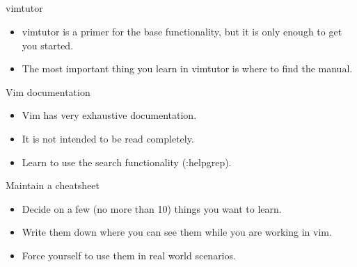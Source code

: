 \documentclass{beamer}
\begin{document}
    \subsection{}
    \begin{frame}{vimtutor}
        \begin{itemize}
            \item vimtutor is a primer for the base functionality, but it is only enough to get you started.
            \item The most important thing you learn in vimtutor is where to find the manual.
        \end{itemize}
    \end{frame}
    \begin{frame}{Vim documentation}
        \begin{itemize}
            \item Vim has very exhaustive documentation.
            \item It is not intended to be read completely.  %
            \item Learn to use the search functionality (:helpgrep).
        \end{itemize}
    \end{frame}
    \begin{frame}{Maintain a cheatsheet}
        \begin{itemize}
            \item Decide on a few (no more than 10) things you want to learn.
            \item Write them down where you can see them while you are working in vim.
            \item Force yourself to use them in real world scenarios.
        \end{itemize}
    \end{frame}
\end{document}
